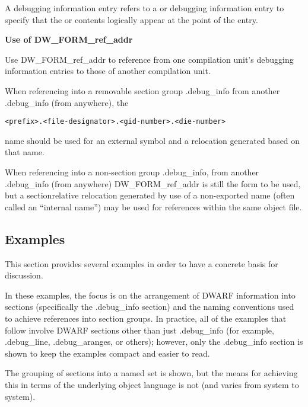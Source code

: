 A  debugging information entry refers
to a 
 or 
 debugging
information entry to specify that the 
 or
 contents logically appear at the point
of the 
 entry.


\textbf{Use of DW\-\_FORM\-\_ref\-\_addr}

Use 
DW\-\_FORM\-\_ref\-\_addr to reference from one compilation
unit's debugging information entries to those of another
compilation unit.

When referencing into a removable section group .debug\_info
from another .debug\_info (from anywhere), the
\begin{alltt}
<prefix>.<file-designator>.<gid-number>.<die-number>
\end{alltt}
name should be used for an external symbol and a relocation
generated based on that name.

When referencing into a non-section group .debug\_info,
from another .debug\_info (from anywhere) 
DW\-\_FORM\-\_ref\-\_addr is
still the form to be used, but a section\dash relative relocation
generated by use of a non-exported name (often called an
``internal name'') may be used for references within the
same object file.

\subsection{Examples}
\label{app:examples}

This section provides several examples in order to have a
concrete basis for discussion.

In these examples, the focus is on the arrangement of DWARF
information into sections (specifically the .debug\_info
section) and the naming conventions used to achieve references
into section groups. In practice, all of the examples that
follow involve DWARF sections other than just .debug\_info
(for example, .debug\_line, .debug\_aranges, or others);
however, only the .debug\_info section is shown to keep the
examples compact and easier to read.

The grouping of sections into a named set is shown, but the means for achieving this in terms of
the underlying object language is not (and varies from system to system).

